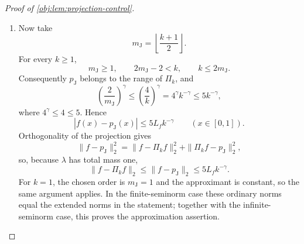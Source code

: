 \begin{proof}[Proof of \cref{obj:lem:projection-control}]
\begin{enumerate}
It also lies in the cosine span through frequency \(2m_{\mathrm J}-2\). Indeed,
\(\mathsf U_{m_{\mathrm J}-1}^4\) is an even polynomial of degree \(4m_{\mathrm J}-4\); hence there is a polynomial \(\mathcal Q_{m_{\mathrm J}}\) such that
\[
\mathsf U_{m_{\mathrm J}-1}(z)^4
=\mathcal Q_{m_{\mathrm J}}(z^2),
\qquad
\deg\mathcal Q_{m_{\mathrm J}}\le2m_{\mathrm J}-2.
\]
Since \(\cos(\vartheta/2)^2=(1+\cos\vartheta)/2\),
\[
\mathcal J_{m_{\mathrm J}}(\vartheta)
=
\frac{\mathcal Q_{m_{\mathrm J}}((1+\cos\vartheta)/2)}
     {\mathcal Z_{m_{\mathrm J}}}.
\]
Thus the kernel is an even trigonometric polynomial. Averaging its trigonometric expansion at \(\vartheta\) and \(-\vartheta\) removes the sine terms, giving real coefficients
\(\mathfrak a_{m_{\mathrm J},j}\), \(0\le j\le2m_{\mathrm J}-2\), with
\[
\mathcal J_{m_{\mathrm J}}(\vartheta)
=\sum_{j=0}^{2m_{\mathrm J}-2}
 \mathfrak a_{m_{\mathrm J},j}\cos(j\vartheta).
\]
Reversing the convolution over one period and using the cosine subtraction formula gives
\[
\begin{aligned}
p_{\mathrm J}(x)
&=\int_{-\pi}^{\pi}
 \bar f(\vartheta)\mathcal J_{m_{\mathrm J}}(\pi x-\vartheta)\,d\vartheta\\
&=\sum_{j=0}^{2m_{\mathrm J}-2}
 \left\{\mathfrak a_{m_{\mathrm J},j}
 \int_{-\pi}^{\pi}\bar f(\vartheta)\cos(j\vartheta)\,d\vartheta\right\}
 \cos(\pi jx).
\end{aligned}
\]
The sine integrals vanish because \(\bar f\) is even. The reversal follows by a change of variable and periodicity. Since \(\varphi_0=1\) and
\(\varphi_j(x)=\sqrt2\cos(\pi jx)\) for \(j\ge1\), this is the required cosine-span representation.

\item Now take
\[
m_{\mathrm J}=\left\lfloor\frac{k+1}{2}\right\rfloor.
\]
For every \(k\ge1\),
\[
m_{\mathrm J}\ge1,\qquad
2m_{\mathrm J}-2<k,\qquad
k\le2m_{\mathrm J}.
\]
Consequently \(p_{\mathrm J}\) belongs to the range of \(\Pi_k\), and
\[
\left(\frac{2}{m_{\mathrm J}}\right)^\gamma
\le\left(\frac4k\right)^\gamma
=4^\gamma k^{-\gamma}
\le5k^{-\gamma},
\]
where \(4^\gamma\le4\le5\). Hence
\[
|f(x)-p_{\mathrm J}(x)|\le5L_fk^{-\gamma}
\qquad(x\in[0,1]).
\]
Orthogonality of the projection gives
\[
\|f-p_{\mathrm J}\|_2^2
=\|f-\Pi_kf\|_2^2+\|\Pi_kf-p_{\mathrm J}\|_2^2,
\]
so, because \(\lambda\) has total mass one,
\[
\|f-\Pi_kf\|_2
\le\|f-p_{\mathrm J}\|_2
\le5L_fk^{-\gamma}.
\]
For \(k=1\), the chosen order is \(m_{\mathrm J}=1\) and the approximant is constant, so the same argument applies. In the finite-seminorm case these ordinary norms equal the extended norms in the statement; together with the infinite-seminorm case, this proves the approximation assertion.


\end{enumerate}
\end{proof}
